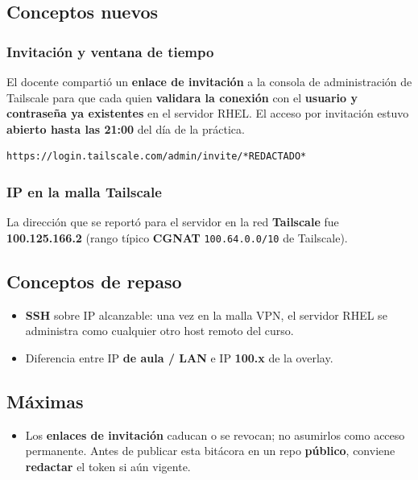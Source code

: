 \documentclass[11pt, letterpaper]{article}
\begin{document}
\subsection{Conceptos nuevos}
\label{sec:orgd0fc1e0}

\subsubsection{Invitación y ventana de tiempo}
\label{sec:org8f5b6ba}
El docente compartió un \textbf{enlace de invitación} a la consola de administración de Tailscale para que cada quien \textbf{validara la conexión} con el \textbf{usuario y contraseña ya existentes} en el servidor RHEL. El acceso por invitación estuvo \textbf{abierto hasta las 21:00} del día de la práctica.

\begin{verbatim}
https://login.tailscale.com/admin/invite/*REDACTADO*
\end{verbatim}
\subsubsection{IP en la malla Tailscale}
\label{sec:orgb51620e}
La dirección que se reportó para el servidor en la red \textbf{Tailscale} fue \textbf{100.125.166.2} (rango típico \textbf{CGNAT} \texttt{100.64.0.0/10} de Tailscale).
\subsection{Conceptos de repaso}
\label{sec:org9091df0}

\begin{itemize}
\item \textbf{SSH} sobre IP alcanzable: una vez en la malla VPN, el servidor RHEL se administra como cualquier otro host remoto del curso.
\item Diferencia entre IP \textbf{de aula / LAN} e IP \textbf{100.x} de la overlay.
\end{itemize}
\subsection{Máximas}
\label{sec:orgb00f04a}

\begin{itemize}
\item Los \textbf{enlaces de invitación} caducan o se revocan; no asumirlos como acceso permanente. Antes de publicar esta bitácora en un repo \textbf{público}, conviene \textbf{redactar} el token si aún vigente.
\end{itemize}
\end{document}
